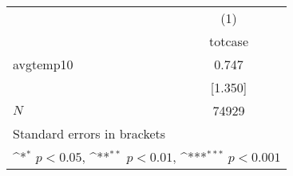 {
\def\sym#1{\ifmmode^{#1}\else\(^{#1}\)\fi}
\begin{tabular}{l*{1}{c}}
\hline\hline
            &\multicolumn{1}{c}{(1)}\\
            &\multicolumn{1}{c}{totcase}\\
\hline
avgtemp10   &       0.747         \\
            &     [1.350]         \\
\hline
\(N\)       &       74929         \\
\hline\hline
\multicolumn{2}{l}{\footnotesize Standard errors in brackets}\\
\multicolumn{2}{l}{\footnotesize \sym{*} \(p<0.05\), \sym{**} \(p<0.01\), \sym{***} \(p<0.001\)}\\
\end{tabular}
}
